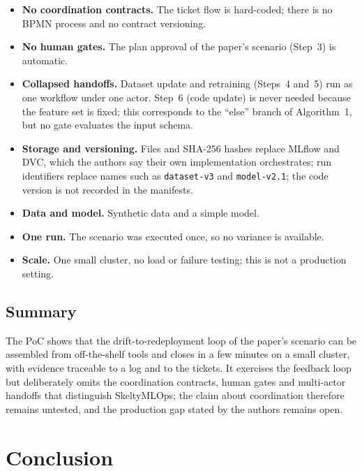 \documentclass[11pt,a4paper]{article}
\begin{document}
\begin{itemize}
  \item \textbf{No coordination contracts.} The ticket flow is hard-coded; there is no BPMN process and no contract versioning.
  \item \textbf{No human gates.} The plan approval of the paper's scenario (Step~3) is automatic.
  \item \textbf{Collapsed handoffs.} Dataset update and retraining (Steps~4 and~5) run as one workflow under one actor. Step~6 (code update) is never needed because the feature set is fixed; this corresponds to the ``else'' branch of Algorithm~1, but no gate evaluates the input schema.
  \item \textbf{Storage and versioning.} Files and SHA-256 hashes replace MLflow and DVC, which the authors say their own implementation orchestrates; run identifiers replace names such as \texttt{dataset-v3} and \texttt{model-v2.1}; the code version is not recorded in the manifests.
  \item \textbf{Data and model.} Synthetic data and a simple model.
  \item \textbf{One run.} The scenario was executed once, so no variance is available.
  \item \textbf{Scale.} One small cluster, no load or failure testing; this is not a production setting.
\end{itemize}

\subsection{Summary}

The PoC shows that the drift-to-redeployment loop of the paper's scenario can be assembled from off-the-shelf tools and closes in a few minutes on a small cluster, with evidence traceable to a log and to the tickets. It exercises the feedback loop but deliberately omits the coordination contracts, human gates and multi-actor handoffs that distinguish SkeltyMLOps; the claim about coordination therefore remains untested, and the production gap stated by the authors remains open.

\section{Conclusion}\label{sec:concl}
\end{document}
